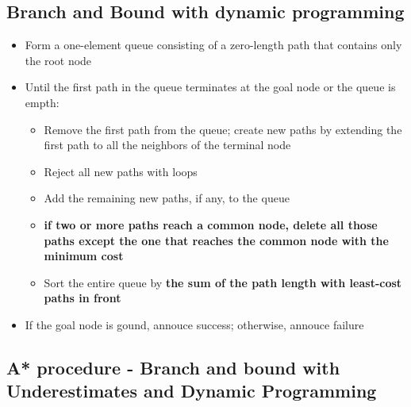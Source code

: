 \documentclass{article}
\begin{document}
\subsection{Branch and Bound with dynamic programming}

\begin{itemize}
  \item Form a one-element queue consisting of a zero-length path 
    that contains only the root node
  \item Until the first path in the queue terminates at the 
    goal node or the queue is empth:
    \begin{itemize}
      \item Remove the first path from the queue; create new paths 
        by extending the first path to all the neighbors
        of the terminal node
      \item Reject all new paths with loops
      \item Add the remaining new paths, if any, to the queue
      \item \textbf{if two or more paths reach a common node,
        delete all those paths except the one that reaches the
        common node with the minimum cost}
      \item Sort the entire queue by \textbf{the sum of the path
        length with least-cost paths in front}
    \end{itemize}
  \item If the goal node is gound, annouce success; otherwise, 
    annouce failure
\end{itemize}

\subsection{A* procedure - Branch and bound with Underestimates
and Dynamic Programming}
\end{document}

